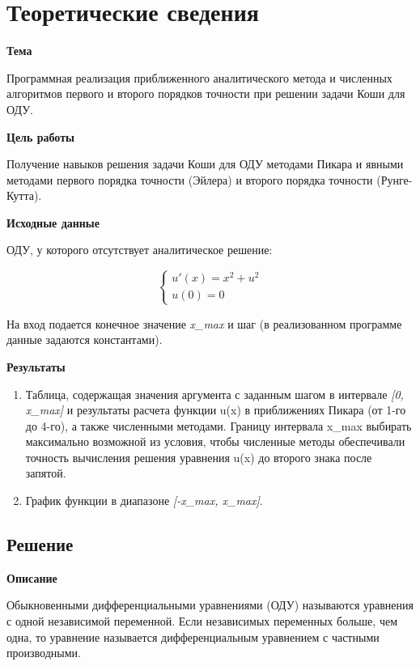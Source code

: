 \chapter{Теоретические сведения}

\textbf{Тема}

Программная реализация приближенного аналитического метода и численных алгоритмов первого и второго порядков точности при решении задачи Коши для ОДУ.

\textbf{Цель работы}

Получение навыков решения задачи Коши для ОДУ методами Пикара и явными методами первого порядка точности (Эйлера) и второго порядка точности (Рунге-Кутта).


\textbf{Исходные данные}

ОДУ, у которого отсутствует аналитическое решение:

\begin{equation}
    \label{initial_odu}
    \begin{cases}
        u'(x) = x^2 + u^2\\
        u(0) = 0
    \end{cases}
\end{equation}\newline

На вход подается конечное значение \textit{x\_max} и шаг (в реализованном программе данные задаются константами).

\textbf{Результаты}
\begin{enumerate}
	\item Таблица, содержащая значения аргумента с заданным шагом в интервале \textit{[0, x\_max]} и результаты расчета функции	u(x) в приближениях Пикара (от 1-го до 4-го), а также численными методами. Границу интервала x\_max выбирать максимально возможной из условия, чтобы численные методы обеспечивали точность вычисления решения уравнения u(x) до второго знака после запятой. 
	\item График функции в диапазоне \textit{[-x\_max, x\_max]}.
\end{enumerate}

\section{Решение}

\textbf{Описание} 

Обыкновенными дифференциальными уравнениями (ОДУ) называются
уравнения с одной независимой переменной. Если независимых переменных больше, чем одна, то уравнение называется дифференциальным уравнением с частными производными.

